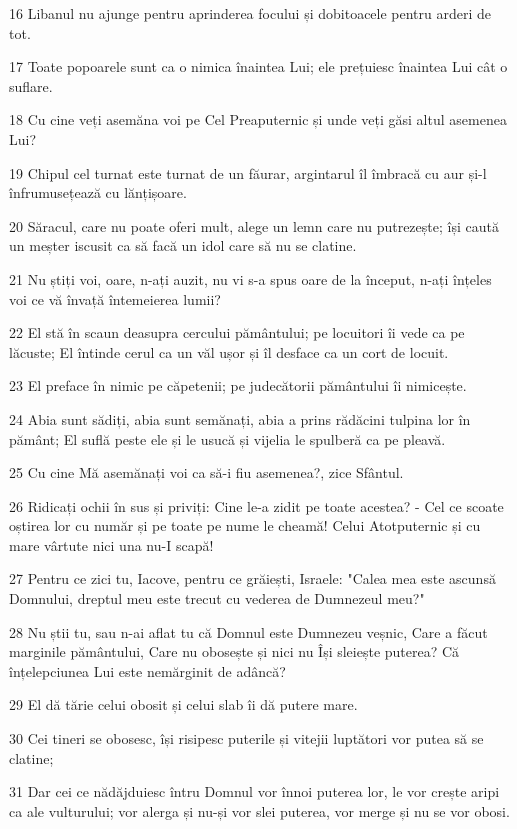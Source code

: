 \par 16 Libanul nu ajunge pentru aprinderea focului și dobitoacele pentru arderi de tot.
\par 17 Toate popoarele sunt ca o nimica înaintea Lui; ele prețuiesc înaintea Lui cât o suflare.
\par 18 Cu cine veți asemăna voi pe Cel Preaputernic și unde veți găsi altul asemenea Lui?
\par 19 Chipul cel turnat este turnat de un făurar, argintarul îl îmbracă cu aur și-l înfrumusețează cu lănțișoare.
\par 20 Săracul, care nu poate oferi mult, alege un lemn care nu putrezește; își caută un meșter iscusit ca să facă un idol care să nu se clatine.
\par 21 Nu știți voi, oare, n-ați auzit, nu vi s-a spus oare de la început, n-ați înțeles voi ce vă învață întemeierea lumii?
\par 22 El stă în scaun deasupra cercului pământului; pe locuitori îi vede ca pe lăcuste; El întinde cerul ca un văl ușor și îl desface ca un cort de locuit.
\par 23 El preface în nimic pe căpetenii; pe judecătorii pământului îi nimicește.
\par 24 Abia sunt sădiți, abia sunt semănați, abia a prins rădăcini tulpina lor în pământ; El suflă peste ele și le usucă și vijelia le spulberă ca pe pleavă.
\par 25 Cu cine Mă asemănați voi ca să-i fiu asemenea?, zice Sfântul.
\par 26 Ridicați ochii în sus și priviți: Cine le-a zidit pe toate acestea? - Cel ce scoate oștirea lor cu număr și pe toate pe nume le cheamă! Celui Atotputernic și cu mare vârtute nici una nu-I scapă!
\par 27 Pentru ce zici tu, Iacove, pentru ce grăiești, Israele: "Calea mea este ascunsă Domnului, dreptul meu este trecut cu vederea de Dumnezeul meu?"
\par 28 Nu știi tu, sau n-ai aflat tu că Domnul este Dumnezeu veșnic, Care a făcut marginile pământului, Care nu obosește și nici nu Își sleiește puterea? Că înțelepciunea Lui este nemărginit de adâncă?
\par 29 El dă tărie celui obosit și celui slab îi dă putere mare.
\par 30 Cei tineri se obosesc, își risipesc puterile și vitejii luptători vor putea să se clatine;
\par 31 Dar cei ce nădăjduiesc întru Domnul vor înnoi puterea lor, le vor crește aripi ca ale vulturului; vor alerga și nu-și vor slei puterea, vor merge și nu se vor obosi.

